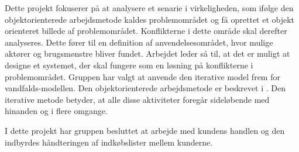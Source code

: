 Dette projekt fokuserer på at analysere et senarie i virkeligheden, som ifølge den objektorienterede arbejdsmetode kaldes problemområdet og få oprettet et objekt orienteret billede af problemområdet. Konflikterne i dette område skal derefter analyseres. Dette fører til en definition af anvendelsesområdet, hvor mulige aktører og brugsmønstre bliver fundet. Arbejdet leder så til, at det er muligt at designe et systemet, der skal fungere som en løsning på konflikterne i problemområdet.
Gruppen har valgt at anvende den iterative model frem for vandfalds-modellen. Den objektorienterede arbejdsmetode er beskrevet i \citep{ooaogd}.
Den iterative metode betyder, at alle disse aktiviteter foregår sideløbende med hinanden og i flere omgange.

I dette projekt har gruppen besluttet at arbejde med kundens handlen og den indbyrdes håndteringen af indkøbslister mellem kunderne.
